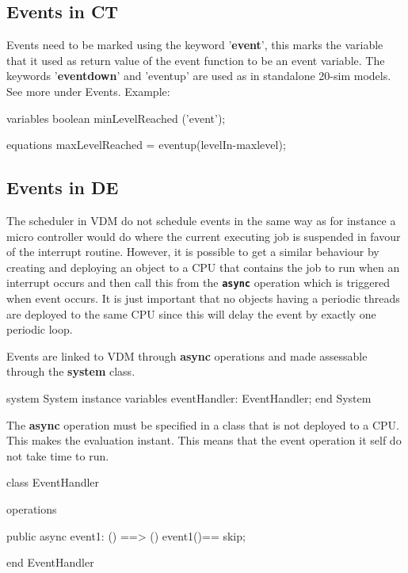 \documentclass{crescendorepchap}
\newcommand{\vdmkeyw}[1]{{\bf\ttfamily #1}}
\begin{document}
\subsection{Events in CT}

Events need to be marked using the keyword '\vdmkeyw{event}', this marks the
variable that it used as return value of the event function to be an
event variable. The keywords '\vdmkeyw{eventdown}' and 'eventup' are used as in
standalone 20-sim models. See more under Events. Example:

\begin{dcl}
variables
  boolean minLevelReached ('event');

equations
  maxLevelReached = eventup(levelIn-maxlevel);
\end{dcl}

\subsection{Events in DE}

The scheduler in VDM do not schedule events in the same way as for
instance a micro controller would do where the current executing job is
suspended in favour of the interrupt routine. However, it is possible to
get a similar behaviour by creating and deploying an object to a CPU
that contains the job to run when an interrupt occurs and then call this
from the \texttt{\textbf{async}} operation which is triggered when event occurs. It is
just important that no objects having a periodic threads are deployed to
the same CPU since this will delay the event by exactly one periodic
loop.

Events are linked to VDM through \vdmkeyw{async} operations and made assessable
through the \vdmkeyw{system} class.

\begin{vdmrt}
system System
instance variables
  eventHandler: EventHandler;
end System
\end{vdmrt}

The \vdmkeyw{async} operation must be specified in a class that is not deployed to
a CPU. This makes the evaluation instant. This means that the event
operation it self do not take time to run.

\begin{vdmrt}
class EventHandler

operations

public async event1: () ==> ()
event1()== skip;

end EventHandler
\end{vdmrt}
\end{document}
